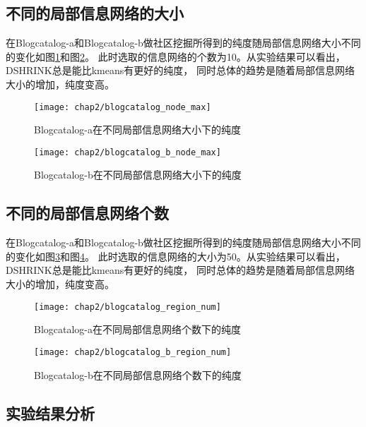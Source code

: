 \subsection{不同的局部信息网络的大小}
\label{sec:results_node_max}

在Blogcatalog-a和Blogcatalog-b做社区挖掘所得到的纯度随局部信息网络大小不同的变化如图\ref{fig:node_max:a}和图\ref{fig:node_max:b}。
此时选取的信息网络的个数为10。从实验结果可以看出，DSHRINK总是能比kmeans有更好的纯度，
同时总体的趋势是随着局部信息网络大小的增加，纯度变高。

\begin{figure}
    \texttt{[image: chap2/blogcatalog\_node\_max]}
    \caption{Blogcatalog-a在不同局部信息网络大小下的纯度}
    \label{fig:node_max:a}
\end{figure}

\begin{figure}
    \texttt{[image: chap2/blogcatalog\_b\_node\_max]}
    \caption{Blogcatalog-b在不同局部信息网络大小下的纯度}
    \label{fig:node_max:b}
\end{figure}

\subsection{不同的局部信息网络个数}
\label{sec:results_region_num}

在Blogcatalog-a和Blogcatalog-b做社区挖掘所得到的纯度随局部信息网络大小不同的变化如图\ref{fig:region_num:a}和图\ref{fig:region_num:b}。
此时选取的信息网络的大小为50。从实验结果可以看出，DSHRINK总是能比kmeans有更好的纯度，
同时总体的趋势是随着局部信息网络大小的增加，纯度变高。

\begin{figure}
    \texttt{[image: chap2/blogcatalog\_region\_num]}
    \caption{Blogcatalog-a在不同局部信息网络个数下的纯度}
    \label{fig:region_num:a}
\end{figure}

\begin{figure}
    \texttt{[image: chap2/blogcatalog\_b\_region\_num]}
    \caption{Blogcatalog-b在不同局部信息网络个数下的纯度}
    \label{fig:region_num:b}
\end{figure}

\subsection{实验结果分析}

